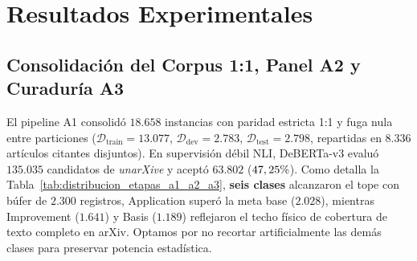 \documentclass[conference]{IEEEtran}
\newcommand{\pct}{\mbox{\symbol{37}}}
\begin{document}
\section{Resultados Experimentales}

\subsection{Consolidación del Corpus 1:1, Panel A2 y Curaduría A3}

El pipeline A1 consolidó $18.658$ instancias con paridad estricta 1:1 y fuga nula entre particiones ($\mathcal{D}_{\text{train}}=13.077$, $\mathcal{D}_{\text{dev}}=2.783$, $\mathcal{D}_{\text{test}}=2.798$, repartidas en $8.336$ artículos citantes disjuntos). En supervisión débil NLI, DeBERTa-v3 evaluó $135.035$ candidatos de \textit{unarXive} y aceptó $63.802$ ($47,25\pct{}$). Como detalla la Tabla~\ref{tab:distribucion_etapas_a1_a2_a3}, \textbf{seis clases} alcanzaron el tope con búfer de $2.300$ registros, Application superó la meta base ($2.028$), mientras Improvement ($1.641$) y Basis ($1.189$) reflejaron el techo físico de cobertura de texto completo en arXiv. Optamos por no recortar artificialmente las demás clases para preservar potencia estadística.
\end{document}

